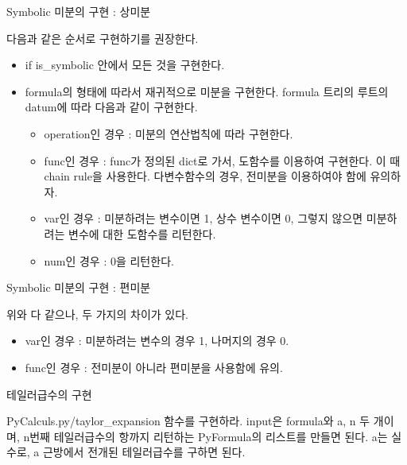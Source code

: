 \documentclass{beamer}
\begin{document}
\begin{frame}{Symbolic 미분의 구현 : 상미분}

다음과 같은 순서로 구현하기를 권장한다. 

\begin{itemize} 
\item if is\_symbolic 안에서 모든 것을 구현한다. 
\item formula의 형태에 따라서 재귀적으로 미분을 구현한다. formula 트리의 루트의 datum에 따라 다음과 같이 구현한다. 
\begin{itemize} 
\item operation인 경우 : 미분의 연산법칙에 따라 구현한다. 
\item func인 경우 : func가 정의된 dict로 가서, 도함수를 이용하여 구현한다. 이 때 chain rule을 사용한다. 다변수함수의 경우, 전미분을 이용하여야 함에 유의하자. 
\item var인 경우 : 미분하려는 변수이면 1, 상수 변수이면 0, 그렇지 않으면 미분하려는 변수에 대한 도함수를 리턴한다. 
\item num인 경우 : 0을 리턴한다. 
\end{itemize}
\end{itemize}

\end{frame}

\begin{frame}{Symbolic 미분의 구현 : 편미분}

위와 다 같으나, 두 가지의 차이가 있다. 

\begin{itemize} 
\item var인 경우 : 미분하려는 변수의 경우 1, 나머지의 경우 0. 
\item func인 경우 : 전미분이 아니라 편미분을 사용함에 유의. 
\end{itemize}
\end{frame}




\begin{frame}{테일러급수의 구현} 

PyCalculs.py/taylor\_expansion 함수를 구현하라. input은 formula와 a, n 두 개이며, n번째 테일러급수의 항까지 리턴하는 PyFormula의 리스트를 만들면 된다. a는 실수로, a 근방에서 전개된 테일러급수를 구하면 된다. 

\end{frame}
\end{document}
